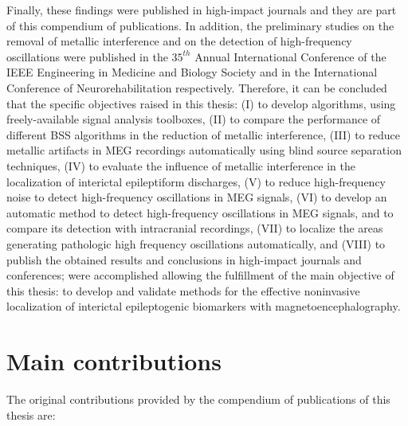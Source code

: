 Finally, these findings were published in high-impact journals and they are part of this compendium of publications. In addition, the preliminary studies on the removal of metallic interference and on the detection of high-frequency oscillations were published in the $35^{th}$ Annual International Conference of the IEEE Engineering in Medicine and Biology Society \citep{Migliorelli2013} and in the International Conference of Neurorehabilitation \citep{Migliorelli2017b} respectively. Therefore, it can be concluded that the specific objectives raised in this thesis: (I) to develop algorithms, using freely-available signal analysis toolboxes, (II) to compare the performance of different BSS algorithms in the reduction of metallic interference, (III) to reduce metallic artifacts in MEG recordings automatically using blind source separation techniques, (IV) to evaluate the influence of metallic interference in the localization of interictal epileptiform discharges, (V) to reduce high-frequency noise to detect high-frequency oscillations in MEG signals, (VI) to develop an automatic method to detect high-frequency oscillations in MEG signals, and to compare its detection with intracranial recordings, (VII) to localize the areas generating pathologic high frequency oscillations automatically, and (VIII) to publish the obtained results and conclusions in high-impact journals and conferences;  were accomplished allowing the fulfillment of the main objective of this thesis: to develop and validate methods for the effective noninvasive localization of interictal epileptogenic biomarkers with magnetoencephalography. 


\section{Main contributions}

The original contributions provided by the compendium of publications of this thesis are:

